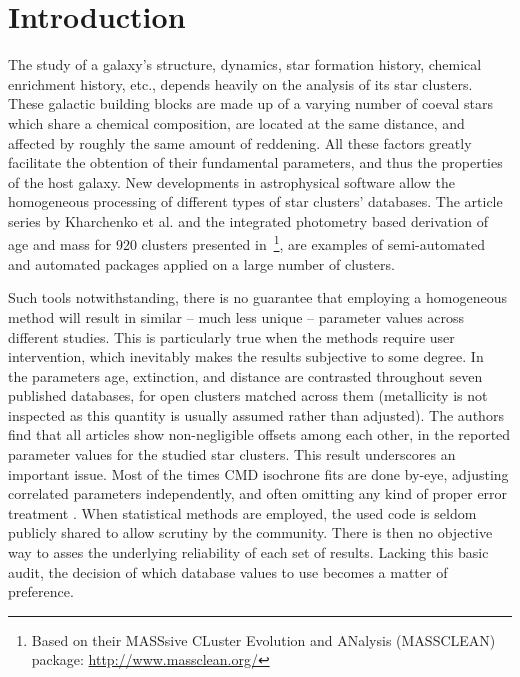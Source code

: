 \documentclass{aa}
\begin{document}

\maketitle
%

\section{Introduction}
\label{sec:intro}

The study of a galaxy's structure, dynamics, star formation history, chemical
enrichment history, etc., depends heavily on the analysis of its star clusters.
These galactic building blocks are made up of a varying number of coeval stars
which share a chemical composition, are located at the same distance, and
affected by roughly the same amount of reddening. All these factors greatly
facilitate the obtention of their fundamental parameters, and thus the
properties of the host galaxy.
%
New developments in astrophysical software allow the homogeneous
processing of different types of star clusters' databases. The article series
by Kharchenko et al. 
\citep[see][and references therein]{Kharchenko_2005,Schmeja_2014}
and the integrated photometry based derivation of age and mass for 920 clusters
presented
in~\cite{Popescu_2012}\footnote{Based on their MASSsive CLuster Evolution and
ANalysis (MASSCLEAN) package: \url{http://www.massclean.org/}}, are examples of
semi-automated and automated packages applied on a large number of clusters.

Such tools notwithstanding, there is no guarantee that employing a homogeneous
method will result in similar -- much less unique -- parameter values
across different studies. This is particularly true when the methods require
user intervention, which inevitably makes the results subjective to some degree.
%
In~\cite{Netopil_2015} the parameters age, extinction, and distance are
contrasted throughout seven published databases, for open clusters matched
across them (metallicity is not inspected as this quantity is usually assumed
rather than adjusted).
The authors find that all articles show non-negligible offsets among each
other, in the reported parameter values for the studied star clusters.
%
This result underscores an important issue.
Most of the times CMD isochrone fits are done by-eye, adjusting correlated
parameters independently, and often omitting any kind of proper error treatment
\citep[see][for a more detailed description of this problem]{vonHippel_2014}.
When statistical methods are employed, the used code is seldom publicly
shared to allow scrutiny by the community. There is then no objective way to
asses the underlying reliability of each set of results.
Lacking this basic audit, the decision of which database values to use
becomes a matter of preference.
\end{document}
